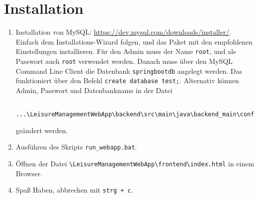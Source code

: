 \section{Installation}

\begin{enumerate}
	\item Installation von MySQL: \url{https://dev.mysql.com/downloads/installer/}. Einfach dem Installations-Wizard folgen, und das Paket mit den empfohlenen Einstellungen installieren. Für den Admin muss der Name \verb|root|, und als Passwort auch \verb|root| verwendet werden. Danach muss über den MySQL Command Line Client die Datenbank \verb|springbootdb| angelegt werden. Das funktioniert über den Befehl \verb|create database test;|. Alternativ können Admin, Passwort und Datenbankname in der Datei 
	\begin{lstlisting}
		...\LeisureManagementWebApp\backend\src\main\java\backend_main\configuration\PersistenceConfiguration.java
	\end{lstlisting}
	geändert werden.
	\item Ausführen des Skripts \verb|run_webapp.bat|.
	\item Öffnen der Datei \verb|\LeisureManagementWebApp\frontend\index.html| in einem Browser.
	\item Spaß Haben, abbrechen mit \verb|strg + c|.
\end{enumerate}